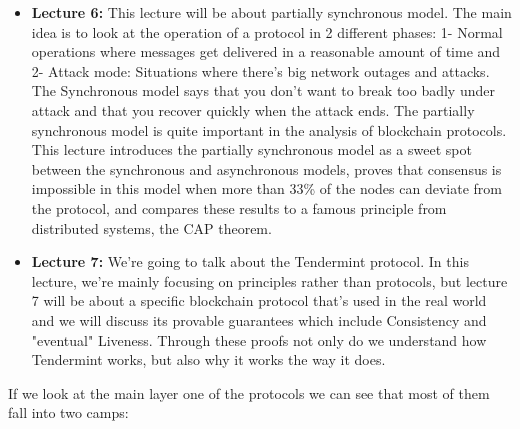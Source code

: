 \begin{itemize}
    \item \textbf{Lecture 6: } This lecture will be about partially synchronous model. The main idea is to look at the operation of a protocol in 2 different phases: 1- Normal operations where messages get delivered in a reasonable amount of time and 2- Attack mode: Situations where there's big network outages and attacks. The Synchronous model says that you don't want to break too badly under attack and that you recover quickly when the attack ends. The partially synchronous model is quite important in the analysis of blockchain protocols. This lecture  introduces the partially synchronous model as a sweet spot between the
    synchronous and asynchronous models, proves that consensus is impossible in this
    model when more than 33\% of the nodes can deviate from the protocol, and compares
    these results to a famous principle from distributed systems, the CAP theorem. 
    \item \textbf{Lecture 7: } We're going to talk about the Tendermint protocol. In this lecture, we're mainly focusing on principles rather than protocols, but lecture 7 will be about a specific blockchain protocol that's used in the real world and we will discuss its provable guarantees which include Consistency and "eventual" Liveness. Through these proofs not only do we understand how Tendermint works, but also why it works the way it does.
\end{itemize}

If we look at the main layer one of the protocols we can see that most of them fall into two camps:

